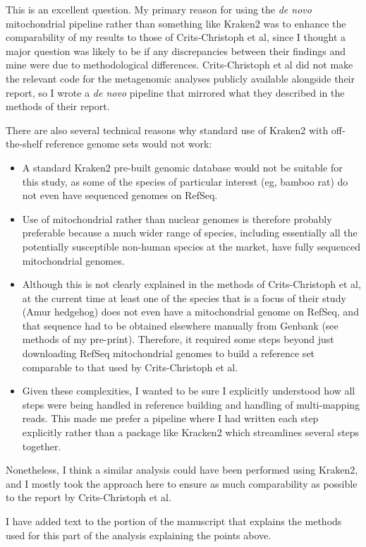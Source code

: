 \documentclass[11pt, oneside]{article}   	%
\newcommand{\response}[1]{{\color{black}#1}}
\begin{document}
\response{
This is an excellent question.
My primary reason for using the \textit{de novo} mitochondrial pipeline rather than something like Kraken2 was to enhance the comparability of my results to those of Crits-Christoph et al, since I thought a major question was likely to be if any discrepancies between their findings and mine were due to methodological differences.
Crits-Christoph et al did not make the relevant code for the metagenomic analyses publicly available alongside their report, so I wrote a \textit{de novo} pipeline that mirrored what they described in the methods of their report.

There are also several technical reasons why standard use of Kraken2 with off-the-shelf reference genome sets would not work:
\begin{itemize}
\item A standard Kraken2 pre-built genomic database would not be suitable for this study, as some of the species of particular interest (eg, bamboo rat) do not even have sequenced genomes on RefSeq.
\item Use of mitochondrial rather than nuclear genomes is therefore probably preferable because a much wider range of species, including essentially all the potentially susceptible non-human species at the market, have fully sequenced mitochondrial genomes.
\item Although this is not clearly explained in the methods of Crits-Christoph et al, at the current time at least one of the species that is a focus of their study (Amur hedgehog) does not even have a mitochondrial genome on RefSeq, and that sequence had to be obtained elsewhere manually from Genbank (see methods of my pre-print). Therefore, it required some steps beyond just downloading RefSeq mitochondrial genomes to build a reference set comparable to that used by Crits-Christoph et al.
\item Given these complexities, I wanted to be sure I explicitly understood how all steps were being handled in reference building and handling of multi-mapping reads. This made me prefer a pipeline where I had written each step explicitly rather than a package like Kracken2 which streamlines several steps together.
\end{itemize}

Nonetheless, I think a similar analysis could have been performed using Kraken2, and I mostly took the approach here to ensure as much comparability as possible to the report by Crits-Christoph et al.

I have added text to the portion of the manuscript that explains the methods used for this part of the analysis explaining the points above.
}
\end{document}
